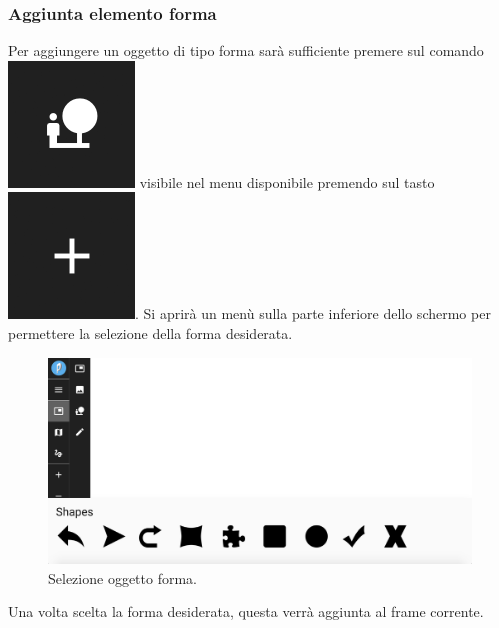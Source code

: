 \subsubsection{Aggiunta elemento forma}
Per aggiungere un oggetto di tipo forma sarà sufficiente premere sul comando \includegraphics[scale=0.4]{img/add_shape.png} visibile nel menu disponibile premendo sul tasto \includegraphics[scale=0.4]{img/add_object.png}. Si aprirà un menù sulla parte inferiore dello schermo per permettere la selezione della forma desiderata.\\
\begin{figure}[h]
\begin{center}
\includegraphics[scale=0.35]{img/sel_shape.png}
\caption{Selezione oggetto forma.}
\end{center}
\end{figure}

Una volta scelta la forma desiderata, questa verrà aggiunta al frame corrente.

